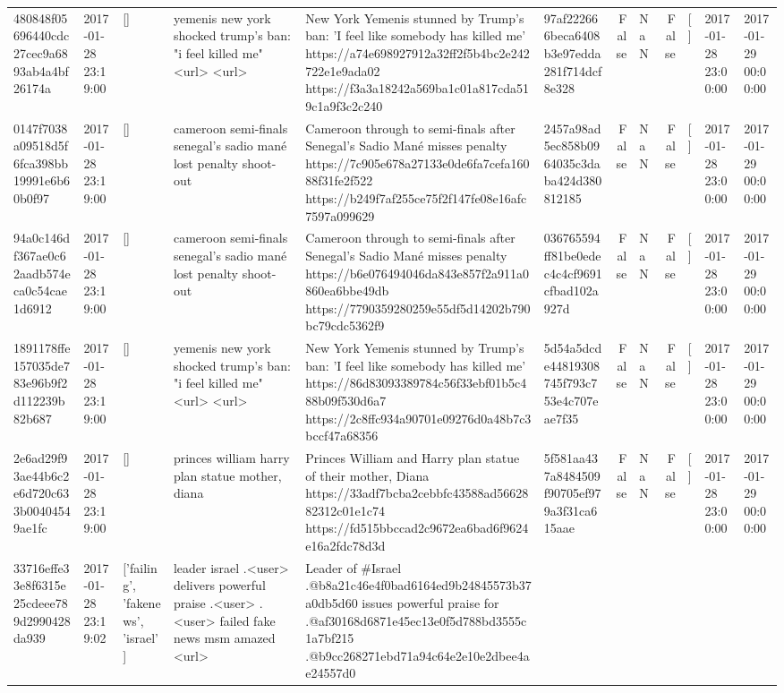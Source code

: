 \begin{tabular}{llllllrlrlll}
480848f05696440cdc27cec9a6893ab4a4bf26174a & 2017-01-28 23:19:00 & [] & yemenis new york shocked trump's ban: "i feel killed me" <url> <url> & New York Yemenis stunned by Trump's ban: 'I feel like somebody has killed me' https://a74e698927912a32ff2f5b4bc2e242722e1e9ada02 https://f3a3a18242a569ba1c01a817cda519c1a9f3c2c240 & 97af222666beca6408b3e97edda281f714dcf8e328 & False & NaN & False & [] & 2017-01-28 23:00:00 & 2017-01-29 00:00:00 \\
0147f7038a09518d5f6fca398bb19991e6b60b0f97 & 2017-01-28 23:19:00 & [] & cameroon semi-finals senegal's sadio mané lost penalty shoot-out & Cameroon through to semi-finals after Senegal’s Sadio Mané misses penalty https://7c905e678a27133e0de6fa7cefa16088f31fe2f522 https://b249f7af255ce75f2f147fe08e16afc7597a099629 & 2457a98ad5ec858b0964035c3daba424d380812185 & False & NaN & False & [] & 2017-01-28 23:00:00 & 2017-01-29 00:00:00 \\
94a0c146df367ae0c62aadb574eca0c54cae1d6912 & 2017-01-28 23:19:00 & [] & cameroon semi-finals senegal's sadio mané lost penalty shoot-out & Cameroon through to semi-finals after Senegal’s Sadio Mané misses penalty https://b6e076494046da843e857f2a911a0860ea6bbe49db https://7790359280259e55df5d14202b790bc79cdc5362f9 & 036765594ff81be0edec4c4cf9691cfbad102a927d & False & NaN & False & [] & 2017-01-28 23:00:00 & 2017-01-29 00:00:00 \\
1891178ffe157035de783e96b9f2d112239b82b687 & 2017-01-28 23:19:00 & [] & yemenis new york shocked trump's ban: "i feel killed me" <url> <url> & New York Yemenis stunned by Trump's ban: 'I feel like somebody has killed me' https://86d83093389784c56f33ebf01b5c488b09f530d6a7 https://2c8ffc934a90701e09276d0a48b7c3bccf47a68356 & 5d54a5dcde44819308745f793c753e4c707eae7f35 & False & NaN & False & [] & 2017-01-28 23:00:00 & 2017-01-29 00:00:00 \\
2e6ad29f93ae44b6c2e6d720c633b00404549ae1fc & 2017-01-28 23:19:00 & [] & princes william harry plan statue mother, diana & Princes William and Harry plan statue of their mother, Diana https://33adf7bcba2cebbfc43588ad5662882312c01e1c74 https://fd515bbccad2c9672ea6bad6f9624e16a2fdc78d3d & 5f581aa437a8484509f90705ef979a3f31ca615aae & False & NaN & False & [] & 2017-01-28 23:00:00 & 2017-01-29 00:00:00 \\
33716effe33e8f6315e25cdeee789d2990428da939 & 2017-01-28 23:19:02 & ['failing', 'fakenews', 'israel'] & leader israel .<user> delivers powerful praise .<user> .<user> failed fake news msm amazed <url> & Leader of \#Israel .@b8a21c46e4f0bad6164ed9b24845573b37a0db5d60 issues powerful praise for .@af30168d6871e45ec13e0f5d788bd3555c1a7bf215 .@b9cc268271ebd71a94c64e2e10e2dbee4ae24557d0


\end{tabular}
